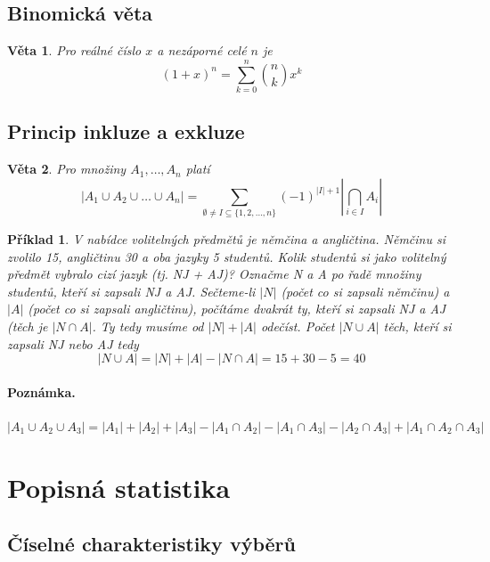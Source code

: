 \documentclass[12pt,a4paper]{article}
\newtheorem{sentence}{Věta}
\newtheorem{example}{Příklad}
\begin{document}
\subsection{Binomická věta}
\begin{sentence}
Pro reálné číslo $x$ a nezáporné celé $n$ je $$(1 + x)^n = \sum\limits_{k=0}^n {n \choose k} x^k $$
\end{sentence}

\subsection{Princip inkluze a exkluze}
\begin{sentence}
	Pro množiny $A_1, \dots, A_n$ platí $$|A_1 \cup A_2 \cup \dots \cup A_n| = \sum\limits_{\emptyset \neq I \subseteq \{1, 2, \dots , n \}} (-1)^{|I| + 1} |\bigcap_{i \in I} A_i |$$
\end{sentence}
\begin{example}
	V nabídce volitelných předmětů je němčina a angličtina. Němčinu si zvolilo 15, angličtinu 30 a oba jazyky 5 studentů. Kolik studentů si jako volitelný předmět vybralo cizí jazyk (tj. NJ + AJ)? Označme N a A po řadě množiny studentů, kteří si zapsali NJ a AJ. Sečteme-li $|N|$ (počet co si zapsali němčinu) a $|A|$ (počet co si zapsali angličtinu), počítáme dvakrát ty, kteří si zapsali NJ a AJ (těch je $|N \cap A|$. Ty tedy musíme od $|N| + |A|$ odečíst. Počet $|N \cup A|$ těch, kteří si zapsali NJ nebo AJ tedy $$|N \cup A| = |N| + |A| - |N \cap A| = 15 + 30 - 5 = 40$$
\end{example}
\paragraph{Poznámka.} $|A_1 \cup A_2 \cup A_3| = |A_1| + |A_2| + |A_3| - |A_1 \cap A_2| - |A_1 \cap A_3| - |A_2 \cap A_3| + |A_1 \cap A_2 \cap A_3|$

\section{Popisná statistika}
\subsection{Číselné charakteristiky výběrů}
\end{document}
